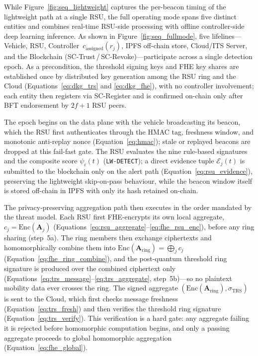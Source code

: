 \documentclass[12pt, a4paper]{report}
\begin{document}
While Figure~\ref{fig:seq_lightweight} captures the per-beacon timing of
the lightweight path at a single RSU, the full operating mode spans
five distinct entities and combines real-time RSU-side processing with
offline controller-side deep learning inference. As shown in
Figure~\ref{fig:seq_fullmode}, five lifelines---Vehicle, RSU,
Controller~$c_{\text{assigned}}(r_j)$, IPFS off-chain store, Cloud/ITS
Server, and the Blockchain (SC-Trust\,/\,SC-Revoke)---participate across
a single detection epoch. As a precondition, the threshold signing keys
and FHE key shares are established once by distributed key generation
among the RSU ring and the Cloud (Equations~\ref{eq:dkg_trs} and
\ref{eq:dkg_fhe}), with no controller involvement; each entity then
registers via SC-Register and is confirmed on-chain only after BFT
endorsement by $2f{+}1$ RSU peers.

The epoch begins on the data plane with the vehicle broadcasting its
beacon, which the RSU first authenticates through the HMAC tag, freshness
window, and monotonic anti-replay nonce (Equation~\ref{eq:hmac}); stale
or replayed beacons are dropped at this fail-fast gate. The RSU evaluates
the nine rule-based signatures and the composite score
$\psi_i(t)$ (\texttt{LW-DETECT}); a direct evidence tuple
$\mathcal{E}_j(t)$ is submitted to the blockchain only on the alert
path (Equation~\ref{eq:rsu_evidence}), preserving the lightweight
skip-on-pass behaviour, while the beacon window itself is stored
off-chain in IPFS with only its hash retained on-chain.

The privacy-preserving aggregation path then executes in the order
mandated by the threat model. Each RSU first FHE-encrypts its own
local aggregate, $c_j = \mathrm{Enc}(\mathbf{A}_j)$
(Equations~\ref{eq:rsu_aggregate}--\ref{eq:fhe_rsu_enc}), before
any ring sharing (step~5a). The ring members then exchange ciphertexts
and homomorphically combine them into
$\mathrm{Enc}(\mathbf{A}_{\text{ring}}) = \bigoplus_j c_j$
(Equation~\ref{eq:fhe_ring_combine}), and the post-quantum threshold ring
signature is produced over the combined ciphertext only
(Equations~\ref{eq:trs_message}--\ref{eq:trs_aggregate}, step~5b)---so no
plaintext mobility data ever crosses the ring. The signed aggregate
$(\mathrm{Enc}(\mathbf{A}_{\text{ring}}), \sigma_{\text{TRS}})$ is sent to
the Cloud, which first checks message freshness
(Equation~\ref{eq:trs_fresh}) and then verifies the threshold ring
signature (Equation~\ref{eq:trs_verify}). This verification is a hard
gate: any aggregate failing it is rejected before homomorphic
computation begins, and only a passing aggregate proceeds to global
homomorphic aggregation (Equation~\ref{eq:fhe_global}).
\end{document}
